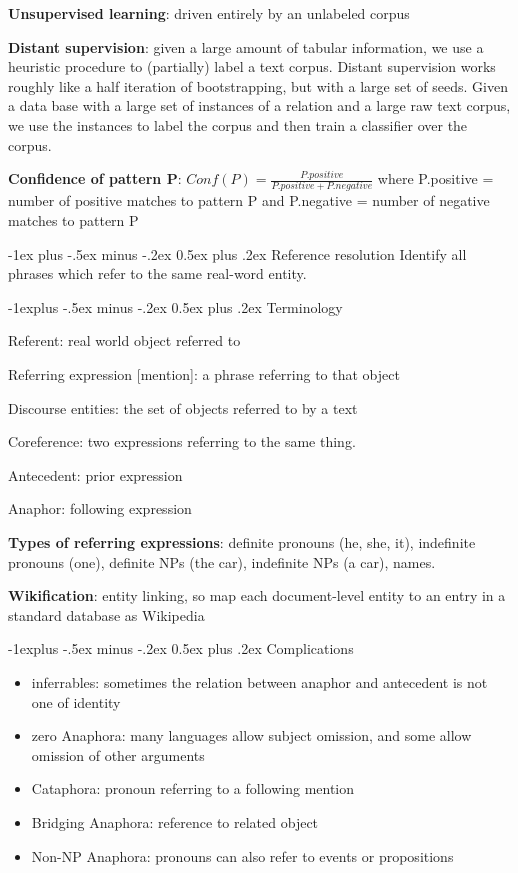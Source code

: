 \documentclass[10pt,landscape]{article}
\makeatletter
\renewcommand{\section}{\@startsection{section}{1}{0mm}%
                                {-1ex plus -.5ex minus -.2ex}%
                                {0.5ex plus .2ex}%
                                {\normalfont\large\bfseries}}
\renewcommand{\subsection}{\@startsection{subsection}{2}{0mm}%
                                {-1explus -.5ex minus -.2ex}%
                                {0.5ex plus .2ex}%
                                {\normalfont\normalsize\bfseries}}
\makeatother
\begin{document}
\begin{multicols}{3}
\textbf{Unsupervised learning}: driven entirely by an unlabeled corpus

\textbf{Distant supervision}: given a large amount of tabular information, we use a heuristic procedure to (partially) label a text corpus.
Distant supervision works roughly like a half iteration of bootstrapping, but with a large set of seeds. Given a data base with a large set of instances of a relation and a large raw text corpus, we use the instances to label the corpus and then train a classifier over the corpus.


\textbf{Confidence of pattern P}:
$Conf(P) = \frac{P.positive}{P.positive + P.negative}$
where P.positive = number of positive matches to pattern P and P.negative = number of negative matches to pattern P


\section{Reference resolution}
Identify all phrases which refer to the same real-word entity.

\subsection{Terminology}

Referent: real world object referred to 

Referring expression [mention]: a phrase referring to that object

Discourse entities:  the set of objects referred to by a text

Coreference: two expressions referring to the same thing.

Antecedent: prior expression

Anaphor: following expression

\textbf{Types of referring expressions}: definite pronouns (he, she, it), indefinite pronouns (one), definite NPs (the car), indefinite NPs (a car), names.

\textbf{Wikification}: entity linking, so map each document-level entity to an entry in a standard database as Wikipedia

\subsection{Complications}
\begin{itemize}
	\item inferrables:  sometimes the relation between anaphor and antecedent is not one of identity
	\item  zero Anaphora: many languages allow subject omission, and some allow omission of other arguments
	\item Cataphora: pronoun referring to a following mention
	\item Bridging Anaphora: reference to related object
	\item Non-NP Anaphora: pronouns can also refer to events or propositions
\end{itemize}


\end{multicols}
\end{document}
